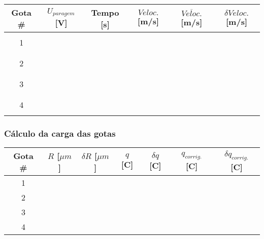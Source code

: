 \documentclass[a4paper,12pt]{article}  %
\begin{document}
\begin{center}
	\begin{tabular}{|c|c|c|c|c|c|}
	\hline
	Gota \#  & $U_{paragem}$ [V] & Tempo [s] & $Veloc.$  [m/s]& $\overline{Veloc.}$ [m/s]	& $\delta Veloc.$ [m/s]  \\
	\hline
	  &  &  & &  & \\ \cline{2-4}
	1 &  & & &  & \\ \cline{2-4}
	  &  &  & &  & \\  \hline
	  &  &  & &  & \\ \cline{2-4}
	2 &  & & &  & \\ \cline{2-4}
	  &  &  & &  & \\ \hline
	  &  &  & &  & \\ \cline{2-4}
	3 &  & & &  & \\ \cline{2-4}
	  &  &  & &  & \\ \hline
	  &  &  & &  & \\ \cline{2-4}
	4 &  & & &  & \\ \cline{2-4}
	  &  &  & &  & \\ \hline
 	\end{tabular}
\end{center}

\vspace{4cm}

\subsubsection{\sf Cálculo da carga das gotas}
\label{sec:calc}
\begin{center}
	\renewcommand{\arraystretch}{1.5}
	\begin{tabular}{|c|c|c|c|c|c|c|}
	\hline
	Gota \#  & $R$ [$\mu m$] & $\delta R$  [$\mu m$] & $q$ [C] & $\delta q$ [C] & $q_{corrig.}$ [C] & $\delta q_{corrig.}$ [C] \\ \hline
	 1 & &  &  & &  &  \\ \hline
	 2 & &  &  & &  & \\ \hline
	 3 & &  &  & &  & \\ \hline
	 4 & &  &  & &  & \\ \hline
 	\end{tabular}
\end{center}
\end{document}
